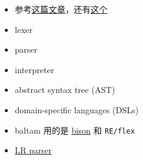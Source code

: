 
\begin{issues}
\issueDraft
\end{issues}

\begin{itemize}
\item 参考\href{https://www.toptal.com/scala/writing-an-interpreter}{这篇文章}，还有\href{https://www.youtube.com/watch?v=Xu4RtLlm42I}{这个}

\item lexer
\item parser
\item interpreter
\item abstract syntax tree (AST)
\item domain-specific languages (DSLs)
\item baltam 用的是 \href{https://www.gnu.org/software/bison/}{bison} 和 \verb|RE/flex|
\item \href{https://en.wikipedia.org/wiki/LR_parser}{LR parser}
\end{itemize}
